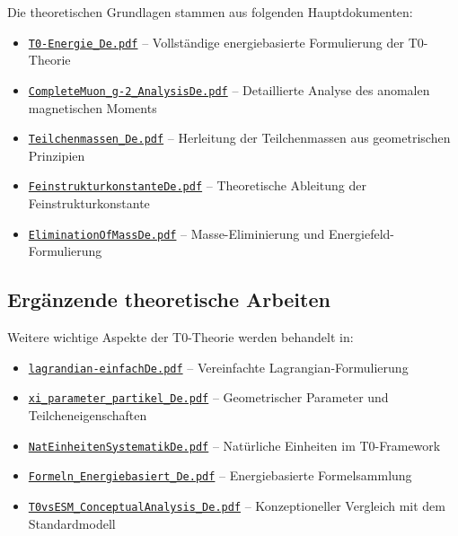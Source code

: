 \documentclass[12pt,a4paper]{article}
\numberwithin{equation}{section}
\begin{document}
	Die theoretischen Grundlagen stammen aus folgenden Hauptdokumenten:
	
	\begin{itemize}
		\item \href{https://github.com/jpascher/T0-Time-Mass-Duality/blob/main/2/pdf/T0-Energie_De.pdf}{\texttt{T0-Energie\_De.pdf}} -- Vollständige energiebasierte Formulierung der T0-Theorie
		\item \href{https://github.com/jpascher/T0-Time-Mass-Duality/blob/main/2/pdf/CompleteMuon_g-2_AnalysisDe.pdf}{\texttt{CompleteMuon\_g-2\_AnalysisDe.pdf}} -- Detaillierte Analyse des anomalen magnetischen Moments
		\item \href{https://github.com/jpascher/T0-Time-Mass-Duality/blob/main/2/pdf/Teilchenmassen_De.pdf}{\texttt{Teilchenmassen\_De.pdf}} -- Herleitung der Teilchenmassen aus geometrischen Prinzipien
		\item \href{https://github.com/jpascher/T0-Time-Mass-Duality/blob/main/2/pdf/FeinstrukturkonstanteDe.pdf}{\texttt{FeinstrukturkonstanteDe.pdf}} -- Theoretische Ableitung der Feinstrukturkonstante
		\item \href{https://github.com/jpascher/T0-Time-Mass-Duality/blob/main/2/pdf/EliminationOfMassDe.pdf}{\texttt{EliminationOfMassDe.pdf}} -- Masse-Eliminierung und Energiefeld-Formulierung
	\end{itemize}
	
	\subsection{Ergänzende theoretische Arbeiten}
	
	Weitere wichtige Aspekte der T0-Theorie werden behandelt in:
	
	\begin{itemize}
		\item \href{https://github.com/jpascher/T0-Time-Mass-Duality/blob/main/2/pdf/lagrandian-einfachDe.pdf}{\texttt{lagrandian-einfachDe.pdf}} -- Vereinfachte Lagrangian-Formulierung
		\item \href{https://github.com/jpascher/T0-Time-Mass-Duality/blob/main/2/pdf/xi_parmater_partikel_De.pdf}{\texttt{xi\_parameter\_partikel\_De.pdf}} -- Geometrischer Parameter und Teilcheneigenschaften
		\item \href{https://github.com/jpascher/T0-Time-Mass-Duality/blob/main/2/pdf/NatEinheitenSystematikDe.pdf}{\texttt{NatEinheitenSystematikDe.pdf}} -- Natürliche Einheiten im T0-Framework
		\item \href{https://github.com/jpascher/T0-Time-Mass-Duality/blob/main/2/pdf/Formeln_Energiebasiert_De.pdf}{\texttt{Formeln\_Energiebasiert\_De.pdf}} -- Energiebasierte Formelsammlung
		\item \href{https://github.com/jpascher/T0-Time-Mass-Duality/blob/main/2/pdf/T0vsESM_ConceptualAnalysis_De.pdf}{\texttt{T0vsESM\_ConceptualAnalysis\_De.pdf}} -- Konzeptioneller Vergleich mit dem Standardmodell
	\end{itemize}
	
\end{document}
